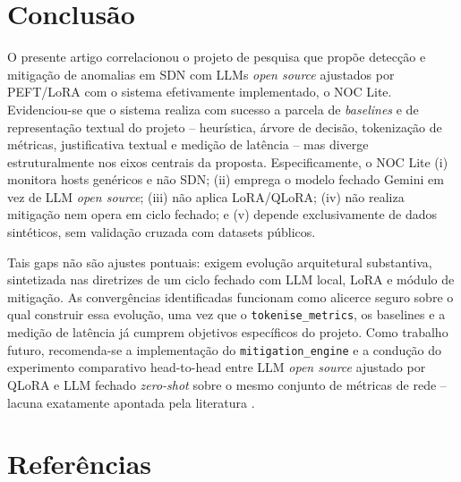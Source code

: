 \documentclass[12pt,a4paper]{article}
\begin{document}
\section{Conclusão}
\label{sec:conclusao}

O presente artigo correlacionou o projeto de pesquisa que propõe detecção e
mitigação de anomalias em SDN com LLMs \textit{open source} ajustados por
PEFT/LoRA \cite{rRODRIGUES} com o sistema efetivamente implementado, o NOC Lite.
Evidenciou-se que o sistema realiza com sucesso a parcela de \textit{
baselines} e de representação textual do projeto -- heurística, árvore de
decisão, tokenização de métricas, justificativa textual e medição de latência
-- mas diverge estruturalmente nos eixos centrais da proposta. Especificamente,
o NOC Lite (i) monitora hosts genéricos e não SDN; (ii) emprega o modelo
fechado Gemini em vez de LLM \textit{open source}; (iii) não aplica LoRA/QLoRA;
(iv) não realiza mitigação nem opera em ciclo fechado; e (v) depende
exclusivamente de dados sintéticos, sem validação cruzada com datasets
públicos.

Tais gaps não são ajustes pontuais: exigem evolução arquitetural substantiva,
sintetizada nas diretrizes de um ciclo fechado com LLM local, LoRA e módulo de
mitigação. As convergências identificadas funcionam como alicerce seguro sobre
o qual construir essa evolução, uma vez que o \texttt{tokenise\_metrics}, os
baselines e a medição de latência já cumprem objetivos específicos do projeto.
Como trabalho futuro, recomenda-se a implementação do \texttt{mitigation\_engine}
e a condução do experimento comparativo head-to-head entre LLM \textit{open
source} ajustado por QLoRA e LLM fechado \textit{zero-shot} sobre o mesmo
conjunto de métricas de rede -- lacuna exatamente apontada pela literatura
\cite{rA49}\cite{rA630}.

\section*{Referências}
\end{document}
